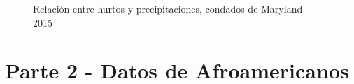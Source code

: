 \documentclass[11pt,a4paper]{article}
\begin{document}
\begin{figure}[!h]
    \centering
    \caption{Relación entre hurtos y precipitaciones, condados de Maryland - 2015}
    \label{fig:my_label}
\end{figure}

\clearpage
\section*{Parte 2 - Datos de Afroamericanos}
\end{document}
